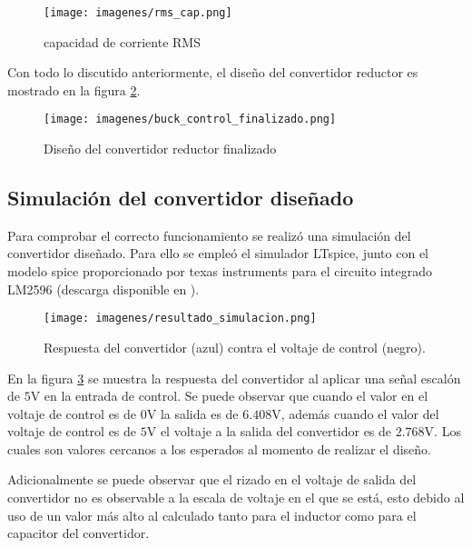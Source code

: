         \begin{figure}[H]
            \centering

            \texttt{[image: imagenes/rms\_cap.png]}
            \caption{capacidad de corriente RMS}
            \label{fig:rms_cap}

        \end{figure}

        Con todo lo discutido anteriormente, el diseño del convertidor reductor es mostrado
        en la figura \ref{fig:buck_finalizado}.

\begin{figure}[H]
    \centering

    \texttt{[image: imagenes/buck\_control\_finalizado.png]}
    \caption{Diseño del convertidor reductor finalizado}
    \label{fig:buck_finalizado}
\end{figure}

\subsection{Simulación del convertidor diseñado}

Para comprobar el correcto funcionamiento se realizó una simulación del 
convertidor diseñado. Para ello se empleó el simulador LTspice, junto con 
el modelo spice proporcionado por texas instruments para el circuito integrado
LM2596 (descarga disponible en \cite{noauthor_lm2596_nodate}). 

\begin{figure}[H]
    \centering
    \texttt{[image: imagenes/resultado\_simulacion.png]}
    \caption{Respuesta del convertidor (azul) contra el voltaje de control
            (negro).}
    \label{fig:sim_buck}
\end{figure}

En la figura \ref{fig:sim_buck} se muestra la respuesta del convertidor al
aplicar una señal escalón de $5\text{V}$ en la entrada de control. Se puede
observar que cuando el valor en el voltaje de control es de $0\text{V}$
la salida es de $6.408\text{V}$, además
cuando el valor del voltaje de control es de $5\text{V}$ el voltaje a la salida
del convertidor es de $2.768\text{V}$. Los cuales son valores cercanos a los esperados
al momento de realizar el diseño. 

Adicionalmente se puede observar que el rizado en el voltaje de salida del 
convertidor no es observable a la escala de voltaje en el que se está, esto debido
al uso de un valor más alto al calculado tanto para el inductor como para el 
capacitor del convertidor.

